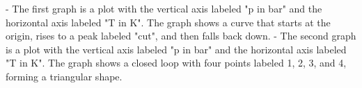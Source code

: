 - The first graph is a plot with the vertical axis labeled "p in bar" and the horizontal axis labeled "T in K". The graph shows a curve that starts at the origin, rises to a peak labeled "cut", and then falls back down.
- The second graph is a plot with the vertical axis labeled "p in bar" and the horizontal axis labeled "T in K". The graph shows a closed loop with four points labeled 1, 2, 3, and 4, forming a triangular shape.